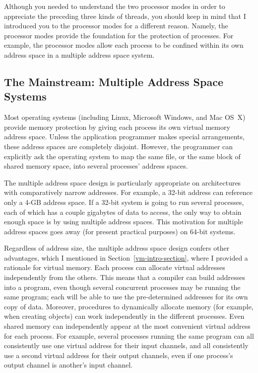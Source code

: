 Although you needed to understand the two processor modes in order to
appreciate the preceding three kinds of threads, you should keep in
mind that I introduced you to the processor modes for a different
reason.  Namely, the processor modes provide the foundation for the
protection of processes.  For example, the processor modes allow each
process to be confined within its own address space in a multiple
address space system.

\subsection{The Mainstream: Multiple Address Space Systems}\label{multiple-address-space-subsection}

Most operating systems (including Linux,
Microsoft Windows, and Mac OS~X) provide memory protection by giving each
process its own virtual memory address space.  Unless the application programmer
makes special arrangements, these address spaces are completely
disjoint.  However, the programmer can explicitly ask the operating
system to map the same file, or the same block of shared memory space,
into several processes' address spaces.

The multiple address space design is particularly appropriate on
architectures with comparatively narrow addresses.  For example, a
32-bit address can reference only a 4-GB address space.  If a 32-bit
system is going to run several processes, each of which has a couple
gigabytes of data to access, the only way to obtain enough space is by
using multiple address spaces.  This motivation for multiple address
spaces goes away (for present practical purposes) on 64-bit systems.

Regardless of address size, the multiple address space design confers
other advantages, which I mentioned in
Section~\ref{vm-intro-section}, where I provided a rationale for virtual memory.
Each process can allocate virtual addresses independently from the
others.  This means that a compiler can build addresses into a
program, even though several concurrent processes may be running the
same program; each will be able to use the pre-determined addresses
for its own copy of data.  Moreover, procedures to dynamically
allocate memory (for example, when creating objects) can work
independently in the different processes.  Even shared memory can
independently appear at the most convenient virtual address for each
process.  For example, several processes running the same program can
all consistently use one virtual address for their input channels, and
all consistently use a second virtual address for their output
channels, even if one process's output channel is another's input
channel.

